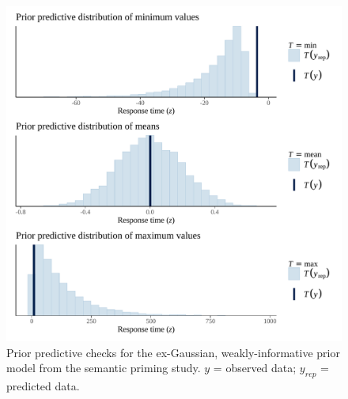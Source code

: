 \documentclass[
  12pt,
  man,floatsintext]{apa7}
\begin{document}
\begin{figure}

{\centering \includegraphics[width=0.8\linewidth]{../semanticpriming/bayesian_analysis/prior_predictive_checks/plots/semanticpriming_priorpredictivecheck_weaklyinformativepriors_exgaussian} 

}

\caption{Prior predictive checks for the ex-Gaussian, weakly-informative prior model from the semantic priming study. \(y\) = observed data; \(y_{rep}\) = predicted data.}\label{fig:semanticpriming-priorpredictivecheck-weaklyinformativepriors-exgaussian}
\end{figure}
\end{document}
